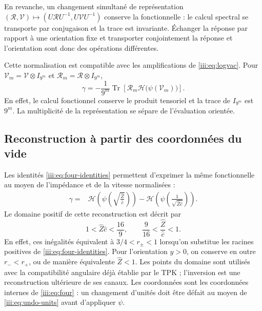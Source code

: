 En revanche, un changement simultané de représentation
$(\mathcal R,\mathcal V)\mapsto
(U\mathcal RU^{-1},U\mathcal VU^{-1})$ conserve la fonctionnelle :
le calcul spectral se transporte par conjugaison et la trace est
invariante. Échanger la réponse par rapport à une orientation fixe
et transporter conjointement la réponse et l’orientation sont donc
des opérations différentes.

Cette normalisation est compatible avec les amplifications de
\eqref{iii:eq:logvac}. Pour
$\mathcal V_m=\mathcal V\otimes I_{9^m}$ et
$\mathcal R_m=\mathcal R\otimes I_{9^m}$,
\begin{equation}
 \gamma=-\frac1{9^m}\operatorname{Tr}
 \left[\mathcal R_m\mathcal H\bigl(\psi(\mathcal V_m)\bigr)\right].
 \label{iii:eq:barbero-amplification}
\end{equation}
En effet, le calcul fonctionnel conserve le produit tensoriel et la trace
de $I_{9^m}$ est $9^m$. La multiplicité de la représentation se sépare
de l’évaluation orientée.

\subsection{Reconstruction à partir des coordonnées du vide}

Les identités \eqref{iii:eq:four-identities} permettent d’exprimer la même
fonctionnelle au moyen de l’impédance et de la vitesse normalisées :
\begin{align}
 \gamma={}&
 \mathcal H\!\left(\psi\!\left(
     \sqrt{\frac{\widehat Z}{\widehat c}}\right)\right)
 -\mathcal H\!\left(\psi\!\left(
     \frac1{\sqrt{\widehat Z\widehat c}}\right)\right).
 \label{iii:eq:barbero-zc}
\end{align}
Le domaine positif de cette reconstruction est décrit par
\begin{equation}
 1<\widehat Z\widehat c<\frac{16}{9},\qquad
 \frac9{16}<\frac{\widehat Z}{\widehat c}<1.
 \label{iii:eq:barbero-zc-domain}
\end{equation}
En effet, ces inégalités équivalent à
$3/4<r_\pm<1$ lorsqu’on substitue les racines positives de
\eqref{iii:eq:four-identities}. Pour l’orientation $y>0$, on conserve
en outre $r_-<r_+$, ou de manière équivalente $\widehat Z<1$. Les points du
domaine sont utilisés avec la compatibilité angulaire déjà établie par
le TPK ; l’inversion est une reconstruction ultérieure de ses canaux.
Les coordonnées sont les coordonnées internes de \eqref{iii:eq:four} : un changement
d’unités doit être défait au moyen de \eqref{iii:eq:undo-units} avant
d’appliquer $\psi$.

